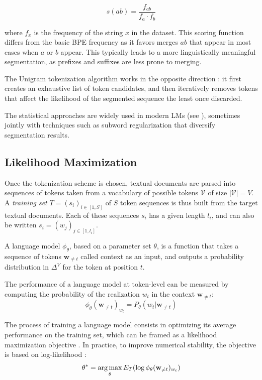 $$
s(ab) = \frac{f_{ab}}{f_a \cdot f_b}
$$

where $f_{x}$ is the frequency of the string $x$ in the dataset. This scoring function differs from the basic BPE frequency as it favors merges $ab$ that appear in most cases when $a$ or $b$ appear. This typically leads to a more linguistically meaningful segmentation, as prefixes and suffixes are less prone to merging.

The Unigram tokenization algorithm \citep{kudo-2018-subword} works in the opposite direction : it first creates an exhaustive list of token candidates, and then iteratively removes tokens that affect the likelihood of the segmented sequence the least once discarded.

The statistical approaches are widely used in modern LMs (see ), sometimes jointly with techniques such as subword regularization \citep{provilkov-etal-2020-bpe} that diversify segmentation results.

\subsection{Likelihood Maximization} Once the tokenization scheme is chosen, textual documents are parsed into sequences of tokens taken from a vocabulary of possible tokens  $\mathcal{V}$ of size $\left|\mathcal{V}\right| = V$. A \textit{training set} $T = (s_i)_{i\in[1, S]}$ of $S$ token sequences is thus built from the target textual documents. Each of these sequences $s_i$ has a given length $l_i$, and can also be written $s_i = (w_j)_{j \in [1, l_i]}$.

A language model $\phi_\theta$, based on a parameter set $\theta$, is a function that takes a sequence of tokens $\mathbf{w}_{\neq t}$ called context as an input, and outputs a probability distribution in $\Delta ^V$ for the token at position $t$.

The performance of a language model at token-level can be measured by computing the probability of the realization $w_t$ in the context $\mathbf{w}_{\neq t}$:
$$
\phi_\theta(\mathbf{w}_{\neq t})_{w_t} = P_\theta(w_t | \mathbf{w}_{\neq t})
$$

The process of training a language model consists in optimizing its average performance on the training set, which can be framed as a likelihood maximization objective \citep{mle}. In practice, to improve numerical stability, the objective is based on log-likelihood :
$$
\theta^* = \argmax_{\theta} E_T \left(\log \phi_\theta(\mathbf{w}_{\neq t})_{w_t} \right)
$$

